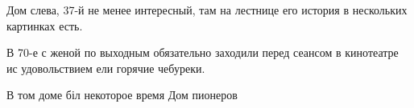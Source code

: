  
 
 
 
 

\qqSecCmt


Дом слева, 37-й не менее интересный, там на лестнице его история в нескольких картинках есть.


В 70-е с женой по выходным обязательно заходили перед сеансом в кинотеатре ис
удовольствием ели горячие чебуреки.


В том доме біл некоторое время Дом пионеров
